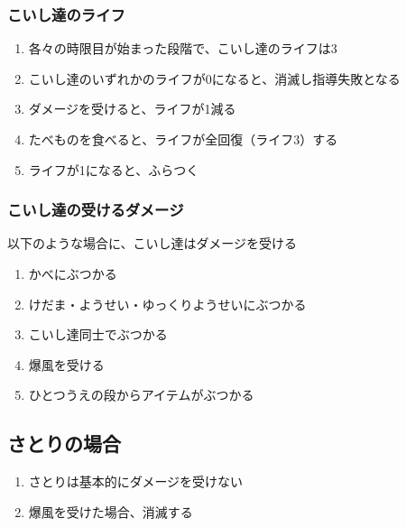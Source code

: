 \subsubsection{こいし達のライフ}
\begin{enumerate}[label={\sarrow}]
\item 各々の時限目が始まった段階で、こいし達のライフは3
\item こいし達のいずれかのライフが0になると、消滅し指導失敗となる
\item ダメージを受けると、ライフが1減る
\item たべものを食べると、ライフが全回復（ライフ3）する
\item ライフが1になると、ふらつく
\end{enumerate}

\subsubsection{こいし達の受けるダメージ}
以下のような場合に、こいし達はダメージを受ける
\begin{enumerate}[label={\sarrow}]
\item かべにぶつかる
\item けだま・ようせい・ゆっくりようせいにぶつかる
\item こいし達同士でぶつかる
\item 爆風を受ける
\item ひとつうえの段からアイテムがぶつかる
\end{enumerate}


\subsection{さとりの場合}
\begin{enumerate}[label={\sarrow}]
\item さとりは基本的にダメージを受けない
\item 爆風を受けた場合、消滅する
\end{enumerate}



\begin{appendices}
\end{appendices}

